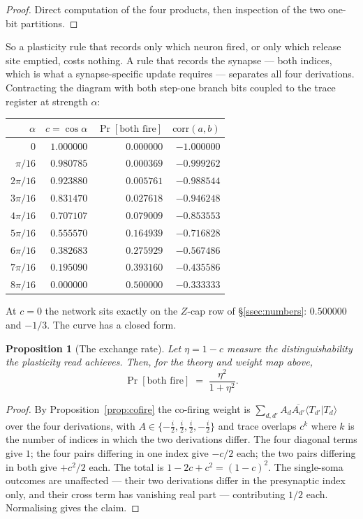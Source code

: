 \documentclass[11pt]{article}
\theoremstyle{definition}
\theoremstyle{plain}
\newtheorem{proposition}[definition]{Proposition}
\begin{document}
\begin{proof}
Direct computation of the four products, then inspection of the two
one-bit partitions.
\end{proof}

So a plasticity rule that records only which neuron fired, or only which release
site emptied, costs nothing. A rule that records the synapse --- both indices,
which is what a synapse-specific update requires --- separates all four
derivations. Contracting the diagram with both step-one branch bits coupled to
the trace register at strength $\alpha$:

\begin{center}
\small
\begin{tabular}{@{}rrrr@{}}
\toprule
$\alpha$ & $c = \cos\alpha$ & $\Pr[\text{both fire}]$ & $\mathrm{corr}(a,b)$ \\
\midrule
$0$        & $1.000000$ & $0.000000$ & $-1.000000$ \\
$\pi/16$   & $0.980785$ & $0.000369$ & $-0.999262$ \\
$2\pi/16$  & $0.923880$ & $0.005761$ & $-0.988544$ \\
$3\pi/16$  & $0.831470$ & $0.027618$ & $-0.946248$ \\
$4\pi/16$  & $0.707107$ & $0.079009$ & $-0.853553$ \\
$5\pi/16$  & $0.555570$ & $0.164939$ & $-0.716828$ \\
$6\pi/16$  & $0.382683$ & $0.275929$ & $-0.567486$ \\
$7\pi/16$  & $0.195090$ & $0.393160$ & $-0.435586$ \\
$8\pi/16$  & $0.000000$ & $0.500000$ & $-0.333333$ \\
\bottomrule
\end{tabular}
\end{center}

At $c = 0$ the network sits exactly on the $Z$-cap row of
\S\ref{ssec:numbers}: $0.500000$ and $-1/3$. The curve has a closed form.

\begin{proposition}[The exchange rate]\label{prop:exchange}
Let $\eta = 1 - c$ measure the distinguishability the plasticity read achieves.
Then, for the theory and weight map above,
\[
  \Pr[\text{both fire}] \;=\; \frac{\eta^{2}}{1 + \eta^{2}} .
\]
\end{proposition}

\begin{proof}
By Proposition~\ref{prop:cofire} the co-firing weight is
$\sum_{d,d'} A_d \overline{A_{d'}} \langle T_{d'} | T_d\rangle$ over the four
derivations, with $A \in \{-\tfrac{i}{2}, \tfrac{i}{2}, \tfrac{i}{2},
-\tfrac{i}{2}\}$ and trace overlaps $c^{k}$ where $k$ is the number of indices
in which the two derivations differ. The four diagonal terms give $1$; the four
pairs differing in one index give $-c/2$ each; the two pairs differing in both
give $+c^2/2$ each. The total is $1 - 2c + c^2 = (1-c)^2$. The single-soma
outcomes are unaffected --- their two derivations differ in the presynaptic
index only, and their cross term has vanishing real part --- contributing
$1/2$ each. Normalising gives the claim.
\end{proof}
\end{document}
